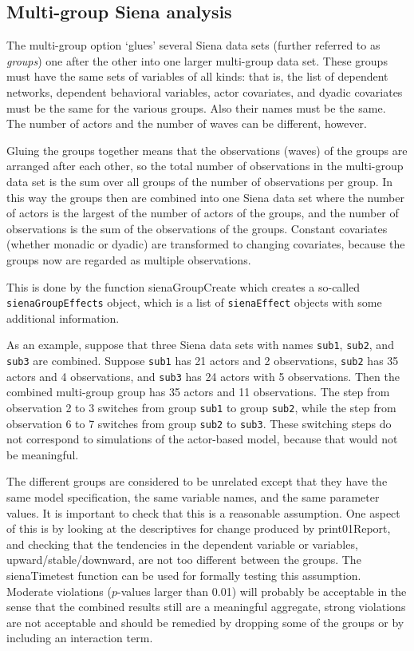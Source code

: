 \documentclass[a4paper,fleqn,11pt]{article}
\newcommand{\+}{\, + \,}
\begin{document}
\subsection{Multi-group Siena analysis}
\label{S_multigroup}

The multi-group option `glues' several Siena data sets
(further referred to as \emph{groups}) one after the other
into one larger multi-group data set.
These groups must have the same sets of variables of all kinds:
that is, the list of dependent networks, dependent behavioral variables,
actor covariates, and dyadic covariates must be the same
for the various groups.
Also their names must be the same.
The number of actors and the number of waves can be different, however.

Gluing the groups together means that the observations (waves) of the groups
are arranged after each other, so the total number of observations
in the multi-group data set is the sum over all groups of the
number of observations per group. In this way
the groups then are combined into one Siena data set
where the number of actors is the largest of the number of
actors of the groups, and the number of observations
is the sum of the observations of the groups.
Constant covariates (whether monadic or dyadic) are transformed
to changing covariates, because the groups now are regarded
as multiple observations.

This is done by the function \textsf{sienaGroupCreate} which creates
a so-called \texttt{sienaGroupEffects} object, which is a list of
\texttt{sienaEffect} objects with some additional information.

As an example, suppose that three Siena data sets with names {\tt sub1}, {\tt sub2},
and {\tt sub3} are combined. Suppose {\tt sub1} has 21 actors and
2 observations, {\tt sub2} has 35 actors and 4 observations,
and {\tt sub3} has 24 actors with 5 observations.
Then the combined multi-group group has 35 actors and 11 observations.
The step from observation 2 to 3 switches from group {\tt sub1}
to group {\tt sub2}, while
the step from observation 6 to 7 switches from group {\tt sub2}
to {\tt sub3}. These switching steps do not correspond to simulations
of the actor-based model, because that would not be meaningful.

The different groups are considered to be unrelated
except that they have the same model specification,
the same variable names, and the same parameter values.
It is important to check that this is a reasonable assumption.
One aspect of this is by looking at the descriptives for change
produced by \textsf{print01Report}, and checking that the
tendencies in the dependent variable or variables, upward/stable/downward,
are not too different between the groups.
The \textsf{sienaTimetest} function can be used for
formally testing this assumption.
Moderate violations ($p$-values larger than 0.01) will probably
be acceptable in the sense that the combined results
still are a meaningful aggregate, strong violations are not acceptable
and should be remedied by dropping some of the groups or by
including an interaction term.
\end{document}

